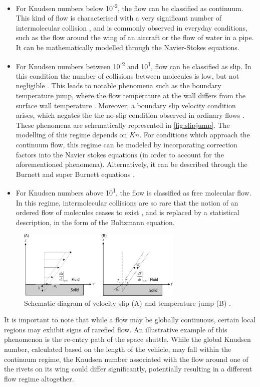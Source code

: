 \begin{itemize}
    \item For Knudsen numbers below 10\textsuperscript{-2}, the flow can be classified as continuum. This kind of flow is characterised with a very significant number of intermolecular collision \cite{aerothermonotes, chambrerarefied}, and is commonly observed in everyday conditions, such as the flow around the wing of an aircraft or the flow of water in a pipe. It can be mathematically modelled through the Navier-Stokes equations.
    \item For Knudsen numbers between 10\textsuperscript{-2} and 10\textsuperscript{1}, flow can be classified as slip. In this condition the number of collisions between molecules is low, but not negligible \cite{chambrerarefied}. This leads to notable phenomena such as the boundary temperature jump, where the flow temperature at the wall differs from the surface wall temperature \cite{slipjump}. Moreover, a boundary slip velocity condition arises, which negates the the no-slip condition observed in ordinary flows \cite{slipjump}. These phenomena are schematically represented in \autoref{fig:slipjump}. The modelling of this regime depends on $Kn$. For conditions which approach the continuum flow, this regime can be modeled by incorporating correction factors into the Navier stokes equations \cite{slipjump} (in order to account for the aforementioned phenomena). Alternatively, it can be described through the Burnett and super Burnett equations \cite{burnett}.
    \item For Knudsen numbers above 10\textsuperscript{1}, the flow is classified as free molecular flow. In this regime, intermolecular collisions are so rare that the notion of an ordered flow of molecules ceases to exist \cite{aerothermonotes, chambrerarefied}, and is replaced by a statistical description, in the form of the Boltzmann equation.
\end{itemize}
\begin{figure}[ht]
    \centering
    \includegraphics[width=0.7\textwidth]{../Images/2. Background/slipjump.png}
    \caption{Schematic diagram of velocity slip (A) and temperature jump (B)  \cite{slipjump}.}
    \label{fig:slipjump}
\end{figure}
It is important to note that while a flow may be globally continuous, certain local regions may exhibit signs of rarefied flow. An illustrative example of this phenomenon is the re-entry path of the space shuttle. While the global Knudsen number, calculated based on the length of the vehicle, may fall within the continuum regime, the Knudsen number associated with the flow around one of the rivets on its wing could differ significantly, potentially resulting in a different flow regime altogether.

